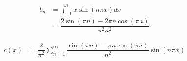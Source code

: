 \documentclass{article}
\begin{document}
\begin{enumerate}
\begin{enumerate}
                        \begin{align*}
                            b_n &= \int_{-1}^{1} x \sin(n\pi x) dx \\
                            &= \dfrac{2 \sin(\pi n) - 2 \pi n \cos(\pi n)}{\pi^2n^2}
                        \end{align*}

                        \begin{align*}
                            c(x) &= \dfrac{2}{\pi^2} \sum_{n=1}^{\infty} \dfrac{\sin(\pi n) - \pi n \cos(\pi n)}{n^2} \sin(n\pi x)
                        \end{align*}
                \end{enumerate}
        \end{enumerate}

    \newpage

    \appendix
\end{document}
